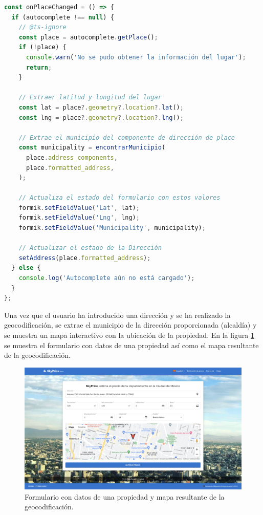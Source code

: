 \begin{lstlisting}[language=javascript, caption={Geocodificación}, label={lst:geocodificacion}]
const onPlaceChanged = () => {
  if (autocomplete !== null) {
    // @ts-ignore
    const place = autocomplete.getPlace();
    if (!place) {
      console.warn('No se pudo obtener la información del lugar');
      return;
    }

    // Extraer latitud y longitud del lugar
    const lat = place?.geometry?.location?.lat();
    const lng = place?.geometry?.location?.lng();

    // Extrae el municipio del componente de dirección de place
    const municipality = encontrarMunicipio(
      place.address_components,
      place.formatted_address,
    );

    // Actualiza el estado del formulario con estos valores
    formik.setFieldValue('Lat', lat);
    formik.setFieldValue('Lng', lng);
    formik.setFieldValue('Municipality', municipality);

    // Actualizar el estado de la Dirección
    setAddress(place.formatted_address);
  } else {
    console.log('Autocomplete aún no está cargado');
  }
};
\end{lstlisting}

Una vez que el usuario ha introducido una dirección y se ha realizado la geocodificación,
se extrae el municipio de la dirección proporcionada (alcaldía) y se muestra
un mapa interactivo con la ubicación de la propiedad. En la figura \ref{fig:geocodificacion}
se muestra el formulario con datos de una propiedad así como el mapa resultante de la
geocodificación.

\begin{figure}[H]
    \centering
    \includegraphics[width=1.0\textwidth]{imagenes/05-implementacion/interfaz-grafica/geocodificacion.png}
    \caption{Formulario con datos de una propiedad y mapa resultante de la geocodificación.}
    \label{fig:geocodificacion}
\end{figure}

